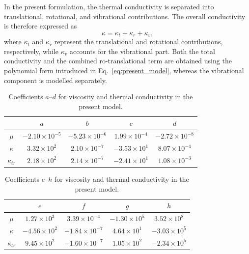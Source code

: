 In the present formulation, the thermal conductivity is separated into translational, rotational, and vibrational contributions. The overall conductivity is therefore expressed as
%
\begin{equation}
\kappa = \kappa_t + \kappa_r + \kappa_v,
\label{eq:kappa_total}
\end{equation}
%
where $\kappa_t$ and $\kappa_r$ represent the translational and rotational contributions, respectively, while $\kappa_v$ accounts for the vibrational part. Both the total conductivity and the combined ro-translational term are obtained using the polynomial form introduced in Eq.~\eqref{eq:present_model}, whereas the vibrational component is modelled separately.

\begin{table}[ht]
    \centering
    \caption{Coefficients $a$–$d$ for viscosity and thermal conductivity in the present model.}
    \renewcommand{\arraystretch}{1.2}
    \begin{tabular}{c c c c c}
        \hline
        & $a$ & $b$ & $c$ & $d$ \\
        \hline
        $\mu$     & $-2.10\times 10^{-5}$ & $-5.23\times 10^{-6}$ & $1.99\times 10^{-4}$ & $-2.72\times 10^{-8}$ \\
        $\kappa$  & $3.32\times 10^{2}$  & $2.10\times 10^{-7}$ & $-3.53\times 10^{1}$ & $8.07\times 10^{-4}$ \\
        $\kappa_{tr}$ & $2.18\times 10^{2}$ & $2.14\times 10^{-7}$ & $-2.41\times 10^{1}$ & $1.08\times 10^{-3}$ \\
        \hline
    \end{tabular}
    \label{tab:present_model_coeffs_ad}
\end{table}


\begin{table}[ht]
    \centering
    \caption{Coefficients $e$–$h$ for viscosity and thermal conductivity in the present model.}
    \renewcommand{\arraystretch}{1.2}
    \begin{tabular}{c c c c c}
        \hline
        & $e$ & $f$ & $g$ & $h$ \\
        \hline
        $\mu$     & $1.27\times 10^{3}$ & $3.39\times 10^{-4}$ & $-1.30\times 10^{5}$ & $3.52\times 10^{8}$ \\
        $\kappa$  & $-4.56\times 10^{2}$ & $-1.84\times 10^{-7}$ & $4.64\times 10^{1}$ & $-3.03\times 10^{5}$ \\
        $\kappa_{tr}$ & $9.45\times 10^{2}$ & $-1.60\times 10^{-7}$ & $1.05\times 10^{2}$ & $-2.34\times 10^{5}$ \\
        \hline
    \end{tabular}
    \label{tab:present_model_coeffs_eh}
\end{table}




